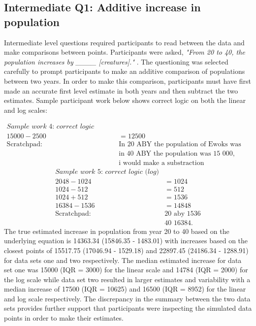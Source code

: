 \documentclass[print]{nuthesis}
\begin{document}
\hypertarget{intermediate-q1-additive-increase-in-population}{%
\subsection{Intermediate Q1: Additive increase in population}\label{intermediate-q1-additive-increase-in-population}}

Intermediate level questions required participants to read between the data and make comparisons between points.
Participants were asked, \textit{"From 20 to 40, the population increases by \_\_\_\_ [creatures]."} .
The questioning was selected carefully to prompt participants to make an additive comparison of populations between two years.
In order to make this comparison, participants must have first made an accurate first level estimate in both years and then subtract the two estimates.
Sample participant work below shows correct logic on both the linear and log scales:

\begin{align}
\textit{Sample work 4: correct logic (linear)} \nonumber\\
15000 - 2500 & = 12500\nonumber\\
\text{Scratchpad: } &\text{In 20 ABY the population of Ewoks was 2500,}\nonumber\\
                   &\text{in 40 ABY the population was 15 000,}\nonumber\\
                   &\text{i would make a substraction}\nonumber
\end{align}
\begin{align}
\textit{Sample work 5: correct logic (log)} \nonumber\\
2048 - 1024  & = 1024 \nonumber\\
1024 - 512   & = 512 \nonumber\\
1024 + 512   & = 1536 \nonumber\\
16384 - 1536 & = 14848 \nonumber\\
\text{Scratchpad: }  & \text{20 aby 1536} \nonumber\\
             & \text{40 16384.} \nonumber
\end{align}
The true estimated increase in population from year 20 to 40 based on the underlying equation is 14363.34 (15846.35 - 1483.01) with increases based on the closest points of 15517.75 (17046.94 - 1529.18) and 22897.45 (24186.34 - 1288.91) for data sets one and two respectively.
The median estimated increase for data set one was 15000 (IQR = 3000) for the linear scale and 14784 (IQR = 2000) for the log scale while data set two resulted in larger estimates and variability with a median increase of 17500 (IQR = 10625) and 16500 (IQR = 8952) for the linear and log scale respectively.
The discrepancy in the summary between the two data sets provides further support that participants were inspecting the simulated data points in order to make their estimates.
\end{document}
